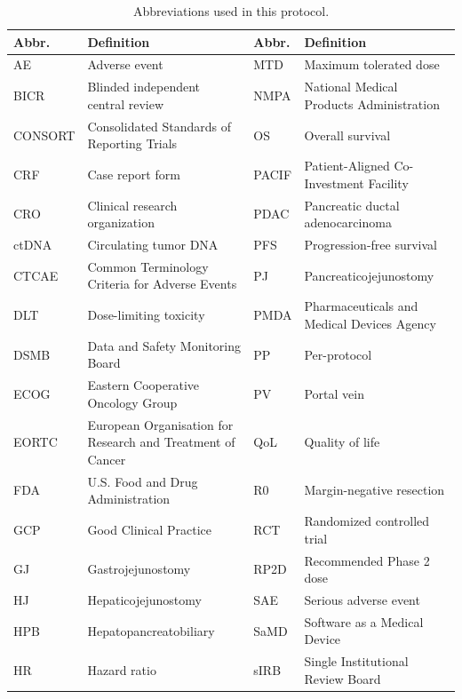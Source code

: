 \begin{table}[htbp]
\centering
\footnotesize
\caption{Abbreviations used in this protocol.}
\label{tab:abbrev}
\begin{tabularx}{\textwidth}{L{1.3cm} L{6.8cm} L{1.3cm} L{6.2cm}}
\toprule
\textbf{Abbr.} & \textbf{Definition} & \textbf{Abbr.} & \textbf{Definition} \\
\midrule
AE     & Adverse event                                  & MTD   & Maximum tolerated dose \\
BICR   & Blinded independent central review              & NMPA  & National Medical Products Administration \\
CONSORT& Consolidated Standards of Reporting Trials      & OS    & Overall survival \\
CRF    & Case report form                                & PACIF & Patient-Aligned Co-Investment Facility \\
CRO    & Clinical research organization                  & PDAC  & Pancreatic ductal adenocarcinoma \\
ctDNA  & Circulating tumor DNA                           & PFS   & Progression-free survival \\
CTCAE  & Common Terminology Criteria for Adverse Events  & PJ    & Pancreaticojejunostomy \\
DLT    & Dose-limiting toxicity                          & PMDA  & Pharmaceuticals and Medical Devices Agency \\
DSMB   & Data and Safety Monitoring Board                & PP    & Per-protocol \\
ECOG   & Eastern Cooperative Oncology Group              & PV    & Portal vein \\
EORTC  & European Organisation for Research and Treatment of Cancer & QoL & Quality of life \\
FDA    & U.S. Food and Drug Administration               & R0    & Margin-negative resection \\
GCP    & Good Clinical Practice                          & RCT   & Randomized controlled trial \\
GJ     & Gastrojejunostomy                               & RP2D  & Recommended Phase 2 dose \\
HJ     & Hepaticojejunostomy                             & SAE   & Serious adverse event \\
HPB    & Hepatopancreatobiliary                          & SaMD  & Software as a Medical Device \\
HR     & Hazard ratio                                    & sIRB  & Single Institutional Review Board \\

\end{tabularx}
\end{table}
